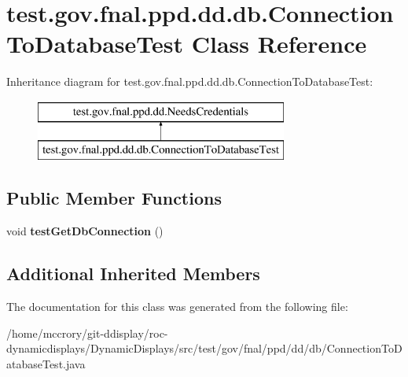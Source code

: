 \hypertarget{classtest_1_1gov_1_1fnal_1_1ppd_1_1dd_1_1db_1_1ConnectionToDatabaseTest}{\section{test.\-gov.\-fnal.\-ppd.\-dd.\-db.\-Connection\-To\-Database\-Test Class Reference}
\label{classtest_1_1gov_1_1fnal_1_1ppd_1_1dd_1_1db_1_1ConnectionToDatabaseTest}
}
Inheritance diagram for test.\-gov.\-fnal.\-ppd.\-dd.\-db.\-Connection\-To\-Database\-Test\-:\begin{figure}[H]
\begin{center}
\leavevmode
\includegraphics[height=2.000000cm]{classtest_1_1gov_1_1fnal_1_1ppd_1_1dd_1_1db_1_1ConnectionToDatabaseTest}
\end{center}
\end{figure}
\subsection*{Public Member Functions}
\begin{DoxyCompactItemize}
\item 
\hypertarget{classtest_1_1gov_1_1fnal_1_1ppd_1_1dd_1_1db_1_1ConnectionToDatabaseTest_a9b14423e963aaf1d50a2ee8db6534c78}{void {\bfseries test\-Get\-Db\-Connection} ()}\label{classtest_1_1gov_1_1fnal_1_1ppd_1_1dd_1_1db_1_1ConnectionToDatabaseTest_a9b14423e963aaf1d50a2ee8db6534c78}

\end{DoxyCompactItemize}
\subsection*{Additional Inherited Members}


The documentation for this class was generated from the following file\-:\begin{DoxyCompactItemize}
\item 
/home/mccrory/git-\/ddisplay/roc-\/dynamicdisplays/\-Dynamic\-Displays/src/test/gov/fnal/ppd/dd/db/Connection\-To\-Database\-Test.\-java\end{DoxyCompactItemize}
